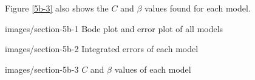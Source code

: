 Figure \ref{5b-3} also shows the $C$ and $\beta$ values found for each model.

              {images/section-5b-1}
              {Bode plot and error plot of all models\label{5b-1}}

              {images/section-5b-2}
              {Integrated errors of each model\label{5b-2}}

              {images/section-5b-3}
              {$C$ and $\beta$ values of each model\label{5b-3}}
